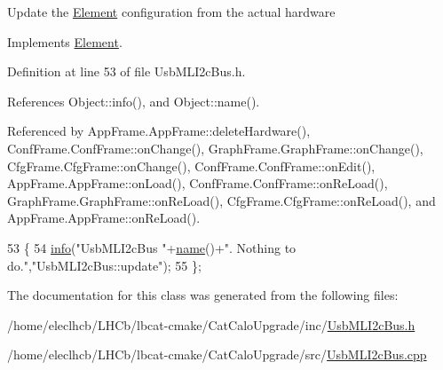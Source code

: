 Update the \hyperlink{classElement}{Element} configuration from the actual hardware 

Implements \hyperlink{classElement_a4e6c83efae95616ebddd03c793a26661}{Element}.



Definition at line 53 of file Usb\+M\+L\+I2c\+Bus.\+h.



References Object\+::info(), and Object\+::name().



Referenced by App\+Frame.\+App\+Frame\+::delete\+Hardware(), Conf\+Frame.\+Conf\+Frame\+::on\+Change(), Graph\+Frame.\+Graph\+Frame\+::on\+Change(), Cfg\+Frame.\+Cfg\+Frame\+::on\+Change(), Conf\+Frame.\+Conf\+Frame\+::on\+Edit(), App\+Frame.\+App\+Frame\+::on\+Load(), Conf\+Frame.\+Conf\+Frame\+::on\+Re\+Load(), Graph\+Frame.\+Graph\+Frame\+::on\+Re\+Load(), Cfg\+Frame.\+Cfg\+Frame\+::on\+Re\+Load(), and App\+Frame.\+App\+Frame\+::on\+Re\+Load().


\begin{DoxyCode}
53                  \{
54     \hyperlink{classObject_a644fd329ea4cb85f54fa6846484b84a8}{info}(\textcolor{stringliteral}{"UsbMLI2cBus "}+\hyperlink{classObject_a300f4c05dd468c7bb8b3c968868443c1}{name}()+\textcolor{stringliteral}{". Nothing to do."},\textcolor{stringliteral}{"UsbMLI2cBus::update"});
55   \};
\end{DoxyCode}


The documentation for this class was generated from the following files\+:\begin{DoxyCompactItemize}
\item 
/home/eleclhcb/\+L\+H\+Cb/lbcat-\/cmake/\+Cat\+Calo\+Upgrade/inc/\hyperlink{UsbMLI2cBus_8h}{Usb\+M\+L\+I2c\+Bus.\+h}\item 
/home/eleclhcb/\+L\+H\+Cb/lbcat-\/cmake/\+Cat\+Calo\+Upgrade/src/\hyperlink{UsbMLI2cBus_8cpp}{Usb\+M\+L\+I2c\+Bus.\+cpp}\end{DoxyCompactItemize}
